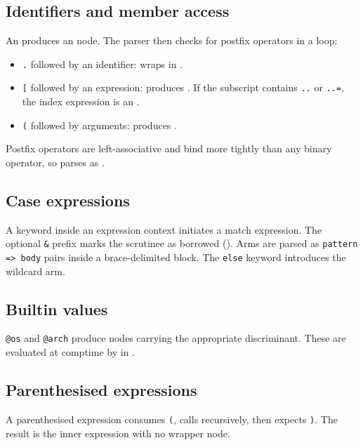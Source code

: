 \subsection{Identifiers and member access}

\pnum
An  produces an  node.  The
parser then checks for postfix operators in a loop:
\begin{itemize}
\item \texttt{.} followed by an identifier: wraps in .
\item \texttt{[} followed by an expression: produces .
  If the subscript contains \texttt{..} or \texttt{..=}, the index expression
  is an .
\item \texttt{(} followed by arguments: produces .
\end{itemize}

\pnum
Postfix operators are left-associative and bind more tightly than any binary
operator, so  parses as .

\subsection{Case expressions}

\pnum
A  keyword inside an expression context initiates a match expression.
The optional \texttt{\&} prefix marks the scrutinee as borrowed
().  Arms are parsed as \texttt{pattern => body}
pairs inside a brace-delimited block.  The \texttt{else} keyword introduces the
wildcard arm.

\subsection{Builtin values}

\pnum
\texttt{@os} and \texttt{@arch} produce  nodes carrying
the appropriate  discriminant.  These are evaluated at
comptime by  in .

\subsection{Parenthesised expressions}

\pnum
A parenthesised expression  consumes \texttt{(}, calls
 recursively, then expects \texttt{)}.  The result is the
inner expression with no wrapper node.

